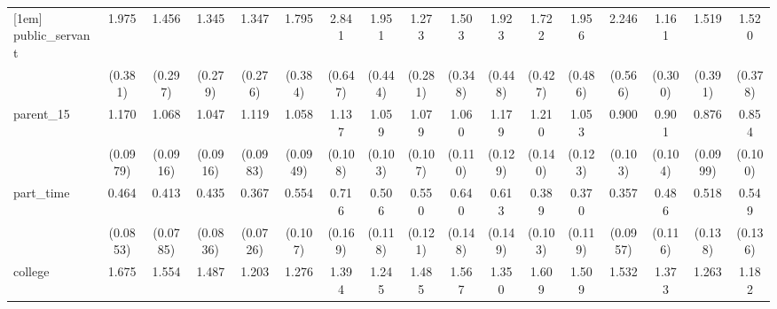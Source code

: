 {\begin{tabular}{l*{16}{c}}
[1em]
public\_servant      &       1.975\sym{***}&       1.456         &       1.345         &       1.347         &       1.795\sym{**} &       2.841\sym{***}&       1.951\sym{**} &       1.273         &       1.503         &       1.923\sym{**} &       1.722\sym{*}  &       1.956\sym{**} &       2.246\sym{**} &       1.161         &       1.519         &       1.520         \\
                    &     (0.381)         &     (0.297)         &     (0.279)         &     (0.276)         &     (0.384)         &     (0.647)         &     (0.444)         &     (0.281)         &     (0.348)         &     (0.448)         &     (0.427)         &     (0.486)         &     (0.566)         &     (0.300)         &     (0.391)         &     (0.378)         \\
[1em]
parent\_15           &       1.170         &       1.068         &       1.047         &       1.119         &       1.058         &       1.137         &       1.059         &       1.079         &       1.060         &       1.179         &       1.210         &       1.053         &       0.900         &       0.901         &       0.876         &       0.854         \\
                    &    (0.0979)         &    (0.0916)         &    (0.0916)         &    (0.0983)         &    (0.0949)         &     (0.108)         &     (0.103)         &     (0.107)         &     (0.110)         &     (0.129)         &     (0.140)         &     (0.123)         &     (0.103)         &     (0.104)         &    (0.0999)         &     (0.100)         \\
[1em]
part\_time           &       0.464\sym{***}&       0.413\sym{***}&       0.435\sym{***}&       0.367\sym{***}&       0.554\sym{**} &       0.716         &       0.506\sym{**} &       0.550\sym{**} &       0.640         &       0.613\sym{*}  &       0.389\sym{***}&       0.370\sym{**} &       0.357\sym{***}&       0.486\sym{**} &       0.518\sym{*}  &       0.549\sym{*}  \\
                    &    (0.0853)         &    (0.0785)         &    (0.0836)         &    (0.0726)         &     (0.107)         &     (0.169)         &     (0.118)         &     (0.121)         &     (0.148)         &     (0.149)         &     (0.103)         &     (0.119)         &    (0.0957)         &     (0.116)         &     (0.138)         &     (0.136)         \\
[1em]
college             &       1.675\sym{***}&       1.554\sym{***}&       1.487\sym{***}&       1.203         &       1.276\sym{*}  &       1.394\sym{**} &       1.245         &       1.485\sym{**} &       1.567\sym{***}&       1.350\sym{*}  &       1.609\sym{**} &       1.509\sym{**} &       1.532\sym{**} &       1.373\sym{*}  &       1.263         &       1.182         \\

\end{tabular}}
